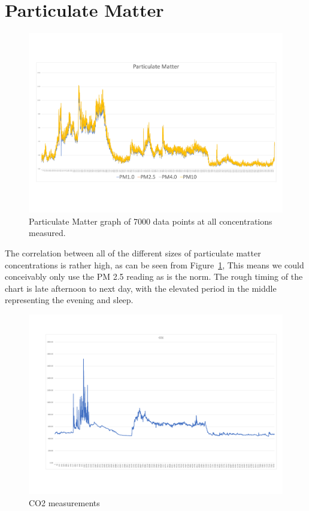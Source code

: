 \section{Particulate Matter}
\vspace{-2em}
\begin{figure}[!htb]
	\centering
	\includegraphics[width=0.9\linewidth]{body/fig/PMall.pdf}
	\caption{Particulate Matter graph of 7000 data points at all concentrations measured.}
	\label{fig:PMall}
\end{figure}

\noindent
The correlation between all of the different sizes of particulate matter concentrations is rather high, as can be seen from Figure~\ref{fig:PMall}, This means we could conceivably only use the PM 2.5 reading as is the norm. The rough timing of the chart is late afternoon to next day, with the elevated period in the middle representing the evening and sleep.


\begin{figure}[!htb]
	\centering
	\includegraphics[width=0.7\linewidth]{body/fig/CO2}
	\caption{CO2 measurements}
	\label{fig:co2}
\end{figure}


